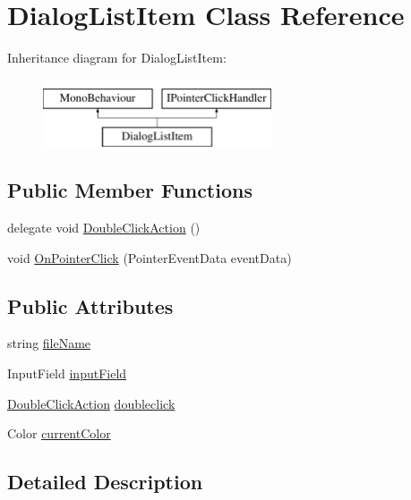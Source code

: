 \hypertarget{class_dialog_list_item}{}\section{Dialog\+List\+Item Class Reference}
\label{class_dialog_list_item}
Inheritance diagram for Dialog\+List\+Item\+:\begin{figure}[H]
\begin{center}
\leavevmode
\includegraphics[height=2.000000cm]{class_dialog_list_item}
\end{center}
\end{figure}
\subsection*{Public Member Functions}
\begin{DoxyCompactItemize}
\item 
delegate void \hyperlink{class_dialog_list_item_a8e8ed693bc47b70037d6c32b56ff9509}{Double\+Click\+Action} ()
\item 
void \hyperlink{class_dialog_list_item_aad94c057f00c485324c216df2e34ab15}{On\+Pointer\+Click} (Pointer\+Event\+Data event\+Data)
\end{DoxyCompactItemize}
\subsection*{Public Attributes}
\begin{DoxyCompactItemize}
\item 
string \hyperlink{class_dialog_list_item_a983b526b4fb79b0b1f4cbb3c4cb19172}{file\+Name}
\item 
Input\+Field \hyperlink{class_dialog_list_item_ab65bf881b76d62d025e51ed041fa9e5f}{input\+Field}
\item 
\hyperlink{class_dialog_list_item_a8e8ed693bc47b70037d6c32b56ff9509}{Double\+Click\+Action} \hyperlink{class_dialog_list_item_a9c33e1c902cc64c5e25cb67f01136bbd}{doubleclick}
\item 
Color \hyperlink{class_dialog_list_item_a60db19a17c429bfdbe9e81c810b40653}{current\+Color}
\end{DoxyCompactItemize}


\subsection{Detailed Description}


